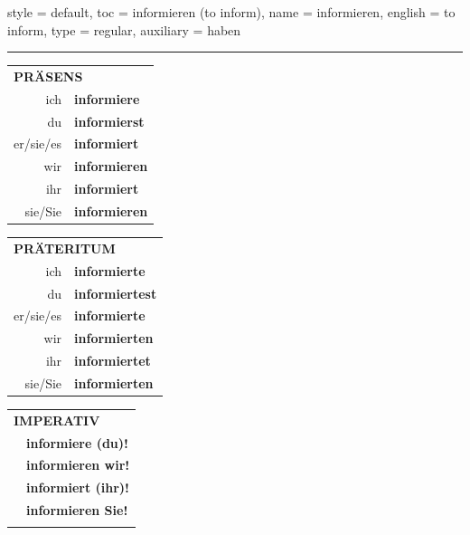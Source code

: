 \begin{verbentry}{
  style = {default},
  toc = {informieren (to inform)},
  name = {informieren},
  english = {to inform},
  type = {regular},
  auxiliary = {haben}
}
 
    
     \vspace{5pt}

    \hrule
    
    \vspace{5pt}

  \begin{tabular}{rl}
     \multicolumn{2}{l}{\textbf{PRÄSENS} }\\
    ich & \textbf{informiere}\\
    du & \textbf{informierst}\\
    er/sie/es & \textbf{informiert}\\
    wir & \textbf{informieren}\\
    ihr & \textbf{informiert}\\
    sie/Sie & \textbf{informieren}\\
  \end{tabular}
  \hfill
  \begin{tabular}{rl}
    \multicolumn{2}{l}{\textbf{PRÄTERITUM} }\\
    ich & \textbf{informierte}\\
    du & \textbf{informiertest}\\
    er/sie/es & \textbf{informierte}\\
    wir & \textbf{informierten}\\
    ihr & \textbf{informiertet}\\
    sie/Sie & \textbf{informierten}\\
  \end{tabular}
  \hfill
  \begin{tabular}{rl}
     \multicolumn{2}{l}{\textbf{IMPERATIV} }\\
   & \textbf{informiere (du)!}\\
   & \textbf{informieren wir!}\\
   & \textbf{informiert (ihr)!}\\
   & \textbf{informieren Sie!}\\
   & \vspace{10pt}
  \end{tabular}

 \vspace{10pt}


\end{verbentry}
